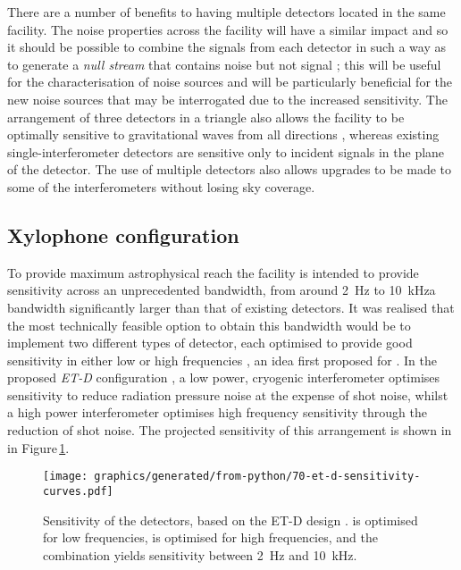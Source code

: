 There are a number of benefits to having multiple detectors located in the same facility. The noise properties across the facility will have a similar impact and so it should be possible to combine the signals from each detector in such a way as to generate a \emph{null stream} that contains noise but not signal \cite{Hewitson2005, Ajith2006}; this will be useful for the characterisation of noise sources and will be particularly beneficial for the new noise sources that may be interrogated due to the increased sensitivity. The arrangement of three detectors in a triangle also allows the facility to be optimally sensitive to gravitational waves from all directions \cite{Winkler1985}, whereas existing single-interferometer detectors are sensitive only to incident signals in the plane of the detector. The use of multiple detectors also allows upgrades to be made to some of the interferometers without losing sky coverage.

\subsection{Xylophone configuration}
To provide maximum astrophysical reach the facility is intended to provide sensitivity across an unprecedented bandwidth, from around \SI{2}{\hertz} to \SI{10}{\kilo\hertz}\textemdash a bandwidth significantly larger than that of existing detectors. It was realised that the most technically feasible option to obtain this bandwidth would be to implement two different types of detector, each optimised to provide good sensitivity in either low or high frequencies \cite{Hild2010}, an idea first proposed for \ALIGO{} \cite{Conforto2004}. In the proposed \emph{ET-D} configuration \cite{Hild2011}, a low power, cryogenic interferometer optimises sensitivity to reduce radiation pressure noise at the expense of shot noise, whilst a high power interferometer optimises high frequency sensitivity through the reduction of shot noise. The projected sensitivity of this arrangement is shown in  in Figure\,\ref{fig:et-d-sensitivity}.

\begin{figure}
  \centering
  \texttt{[image: graphics/generated/from-python/70-et-d-sensitivity-curves.pdf]}
  \caption[Sensitivity curves for the Einstein Telescope]{\label{fig:et-d-sensitivity}Sensitivity of the \ET{} detectors, based on the ET-D design \cite{Hild2011}. \ETLF{} is optimised for low frequencies, \ETHF{} is optimised for high frequencies, and the combination yields sensitivity between \SI{2}{\hertz} and \SI{10}{\kilo\hertz}.}
\end{figure}

